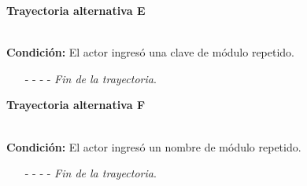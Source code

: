\hypertarget{CU5-1:TAE}{\textbf{Trayectoria alternativa E}}\\
\noindent \textbf{Condición:} El actor ingresó una clave de módulo repetido.
\begin{enumerate}
	\UCpaso[\UCsist] Muestra el mensaje  señalando el campo que presenta la duplicidad en la pantalla 
	\UCpaso Regresa al paso \ref{CU5.1-P3} de la trayectoria principal.
	\item[- -] - - {\em {Fin de la trayectoria}}.
\end{enumerate}
\hypertarget{CU5-1:TAF}{\textbf{Trayectoria alternativa F}}\\
\noindent \textbf{Condición:} El actor ingresó un nombre de módulo repetido.
\begin{enumerate}
	\UCpaso[\UCsist] Muestra el mensaje  señalando el campo que presenta la duplicidad en la pantalla 
	\UCpaso Regresa al paso \ref{CU5.1-P3} de la trayectoria principal.
	\item[- -] - - {\em {Fin de la trayectoria}}.
\end{enumerate}	

